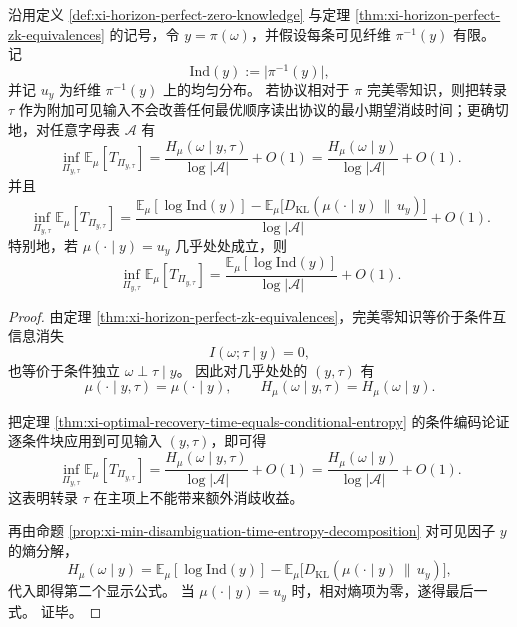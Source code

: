 \begin{theorem}[完美零知识下最小消歧时间的严格不变性]\label{thm:xi-time-part9q-perfect-zk-no-disambiguation-gain}
沿用定义 \ref{def:xi-horizon-perfect-zero-knowledge} 与定理 \ref{thm:xi-horizon-perfect-zk-equivalences} 的记号，令 \(y=\pi(\omega)\)，并假设每条可见纤维 \(\pi^{-1}(y)\) 有限。
记
\[
\mathrm{Ind}(y):=\bigl|\pi^{-1}(y)\bigr|,
\]
并记 \(u_y\) 为纤维 \(\pi^{-1}(y)\) 上的均匀分布。
若协议相对于 \(\pi\) 完美零知识，则把转录 \(\tau\) 作为附加可见输入不会改善任何最优顺序读出协议的最小期望消歧时间；更确切地，对任意字母表 \(\mathcal A\) 有
\[
\inf_{\Pi_{y,\tau}}\mathbb E_\mu[T_{\Pi_{y,\tau}}]
=
\frac{H_\mu(\omega\mid y,\tau)}{\log|\mathcal A|}+O(1)
=
\frac{H_\mu(\omega\mid y)}{\log|\mathcal A|}+O(1).
\]
并且
\[
\inf_{\Pi_{y,\tau}}\mathbb E_\mu[T_{\Pi_{y,\tau}}]
=
\frac{\mathbb E_\mu[\log \mathrm{Ind}(y)]
-\mathbb E_\mu\!\bigl[D_{\mathrm{KL}}(\mu(\cdot\mid y)\,\|\,u_y)\bigr]}{\log|\mathcal A|}
+O(1).
\]
特别地，若 \(\mu(\cdot\mid y)=u_y\) 几乎处处成立，则
\[
\inf_{\Pi_{y,\tau}}\mathbb E_\mu[T_{\Pi_{y,\tau}}]
=
\frac{\mathbb E_\mu[\log \mathrm{Ind}(y)]}{\log|\mathcal A|}+O(1).
\]
\end{theorem}
\begin{proof}
由定理 \ref{thm:xi-horizon-perfect-zk-equivalences}，完美零知识等价于条件互信息消失
\[
I(\omega;\tau\mid y)=0,
\]
也等价于条件独立 \(\omega\perp\tau\mid y\)。
因此对几乎处处的 \((y,\tau)\) 有
\[
\mu(\cdot\mid y,\tau)=\mu(\cdot\mid y),
\qquad
H_\mu(\omega\mid y,\tau)=H_\mu(\omega\mid y).
\]

把定理 \ref{thm:xi-optimal-recovery-time-equals-conditional-entropy} 的条件编码论证逐条件块应用到可见输入 \((y,\tau)\)，即可得
\[
\inf_{\Pi_{y,\tau}}\mathbb E_\mu[T_{\Pi_{y,\tau}}]
=
\frac{H_\mu(\omega\mid y,\tau)}{\log|\mathcal A|}+O(1)
=
\frac{H_\mu(\omega\mid y)}{\log|\mathcal A|}+O(1).
\]
这表明转录 \(\tau\) 在主项上不能带来额外消歧收益。

再由命题 \ref{prop:xi-min-disambiguation-time-entropy-decomposition} 对可见因子 \(y\) 的熵分解，
\[
H_\mu(\omega\mid y)
=
\mathbb E_\mu[\log \mathrm{Ind}(y)]
-\mathbb E_\mu\!\bigl[D_{\mathrm{KL}}(\mu(\cdot\mid y)\,\|\,u_y)\bigr],
\]
代入即得第二个显示公式。
当 \(\mu(\cdot\mid y)=u_y\) 时，相对熵项为零，遂得最后一式。
证毕。
\end{proof}

